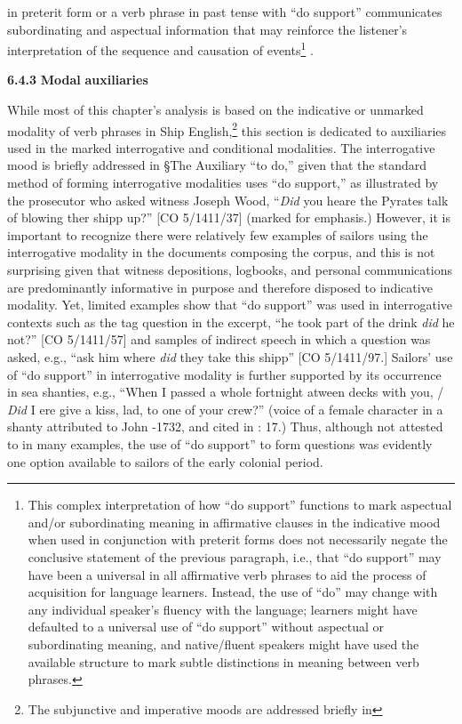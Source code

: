 in preterit form or a verb phrase in past tense with “do support” communicates subordinating and aspectual information that may reinforce the listener’s interpretation of the sequence and causation of events\footnote{This complex interpretation of how “do support” functions to mark aspectual and/or subordinating meaning in affirmative clauses in the indicative mood when used in conjunction with preterit forms does not necessarily negate the conclusive statement of the previous paragraph, i.e., that “do support” may have been a universal in all affirmative verb phrases to aid the process of acquisition for language learners. Instead, the use of “do” may change with any individual speaker’s fluency with the language; learners might have defaulted to a universal use of “do support” without aspectual or subordinating meaning, and native/fluent speakers might have used the available structure to mark subtle distinctions in meaning between verb phrases.} .  

\textbf{6.4.3} \textbf{Modal} \textbf{auxiliaries}

  While most of this chapter’s analysis is based on the indicative or unmarked modality of verb phrases in Ship English,\footnote{The subjunctive and imperative moods are addressed briefly in } this section is dedicated to auxiliaries used in the marked interrogative and conditional modalities. The interrogative mood is briefly addressed in §The Auxiliary “to do,” given that the standard method of forming interrogative modalities uses “do support,” as illustrated by the prosecutor who asked witness Joseph Wood, “\textit{Did} you heare the Pyrates talk of blowing ther shipp up?” [CO 5/1411/37] (marked for emphasis.) However, it is important to recognize there were relatively few examples of sailors using the interrogative modality in the documents composing the corpus, and this is not surprising given that witness depositions, logbooks, and personal communications are predominantly informative in purpose and therefore disposed to indicative modality. Yet, limited examples show that “do support” was used in interrogative contexts such as the tag question in the excerpt, “he took part of the drink \textit{did} he not?” [CO 5/1411/57] and samples of indirect speech in which a question was asked, e.g., “ask him where \textit{did} they take this shipp” [CO 5/1411/97.] Sailors’ use of “do support” in interrogative modality is further supported by its occurrence in sea shanties, e.g., “When I passed a whole fortnight atween decks with you, / \textit{Did} I ere give a kiss, lad, to one of your crew?” (voice of a female character in a shanty attributed to John \citealt{Gay1685}-1732, and cited in \citealt{Hugill1969}: 17.) Thus, although not attested to in many examples, the use of “do support” to form questions was evidently one option available to sailors of the early colonial period.   

